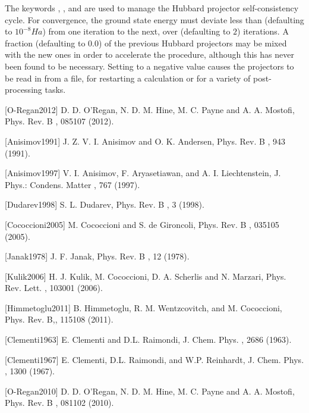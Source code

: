 \documentclass[letterpaper,10pt,english]{sphinxmanual}
\begin{document}
The keywords , , and
 are used to manage the Hubbard projector
self-consistency cycle. For convergence, the ground state energy must
deviate less than  (defaulting to
\(10^{-8}Ha\)) from one  iteration to the next, over
 (defaulting to \(2\)) iterations. A fraction
 (defaulting to \(0.0\)) of the previous
Hubbard projectors may be mixed with the new ones in order to accelerate
the procedure, although this has never been found to be necessary.
Setting  to a negative value causes the
projectors to be read in from a  file, for
restarting a  calculation or for a variety of
post-processing tasks.

{[}O-Regan2012{]} D. D. O’Regan, N. D. M. Hine, M. C. Payne and A. A. Mostofi, Phys. Rev. B , 085107 (2012).

{[}Anisimov1991{]} J. Z. V. I. Anisimov and O. K. Andersen, Phys. Rev. B , 943 (1991).

{[}Anisimov1997{]} V. I. Anisimov, F. Aryasetiawan, and A. I. Liechtenstein, J. Phys.: Condens. Matter , 767 (1997).

{[}Dudarev1998{]} S. L. Dudarev, Phys. Rev. B , 3 (1998).

{[}Cococcioni2005{]} M. Cococcioni and S. de Gironcoli, Phys. Rev. B , 035105 (2005).

{[}Janak1978{]} J. F. Janak, Phys. Rev. B , 12 (1978).

{[}Kulik2006{]} H. J. Kulik, M. Cococcioni, D. A. Scherlis and N. Marzari, Phys. Rev. Lett. , 103001 (2006).

{[}Himmetoglu2011{]} B. Himmetoglu, R. M. Wentzcovitch, and M. Cococcioni, Phys. Rev. B,, 115108 (2011).

{[}Clementi1963{]} E. Clementi and D.L. Raimondi, J. Chem. Phys. , 2686 (1963).

{[}Clementi1967{]} E. Clementi, D.L. Raimondi, and W.P. Reinhardt, J. Chem. Phys. , 1300 (1967).

{[}O-Regan2010{]} D. D. O’Regan, N. D. M. Hine, M. C. Payne and A. A. Mostofi, Phys. Rev. B , 081102 (2010).
\end{document}
